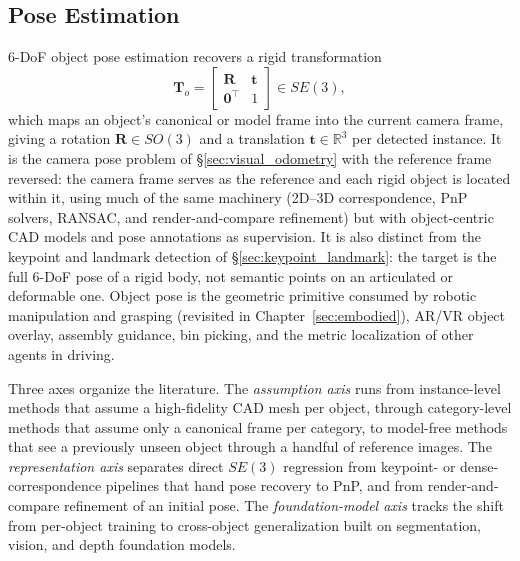 

\subsection{Pose Estimation}
\label{sec:object_pose}

6-DoF object pose estimation recovers a rigid transformation
\begin{equation}
\mathbf{T}_o =
\begin{bmatrix}
\mathbf{R} & \mathbf{t}\\
\mathbf{0}^{\top} & 1
\end{bmatrix}
\in SE(3),
\end{equation}
which maps an object's canonical or model frame into the current camera frame, giving a rotation $\mathbf{R}\in SO(3)$ and a translation $\mathbf{t}\in\mathbb{R}^3$ per detected instance.
It is the camera pose problem of \S\ref{sec:visual_odometry} with the reference frame reversed: the camera frame serves as the reference and each rigid object is located within it, using much of the same machinery (2D--3D correspondence, PnP solvers, RANSAC, and render-and-compare refinement) but with object-centric CAD models and pose annotations as supervision.
It is also distinct from the keypoint and landmark detection of \S\ref{sec:keypoint_landmark}: the target is the full 6-DoF pose of a rigid body, not semantic points on an articulated or deformable one.
Object pose is the geometric primitive consumed by robotic manipulation and grasping (revisited in Chapter~\ref{sec:embodied}), AR/VR object overlay, assembly guidance, bin picking, and the metric localization of other agents in driving.

Three axes organize the literature. The \emph{assumption axis} runs from instance-level methods that assume a high-fidelity CAD mesh per object, through category-level methods that assume only a canonical frame per category, to model-free methods that see a previously unseen object through a handful of reference images. The \emph{representation axis} separates direct $SE(3)$ regression from keypoint- or dense-correspondence pipelines that hand pose recovery to PnP, and from render-and-compare refinement of an initial pose. The \emph{foundation-model axis} tracks the shift from per-object training to cross-object generalization built on segmentation, vision, and depth foundation models.

